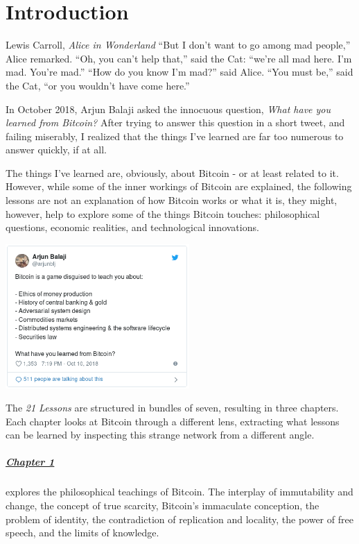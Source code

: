 \chapter*{Introduction}
\label{ch:introduction}

\begin{chapquote}{Lewis Carroll, \textit{Alice in Wonderland}}
\enquote{But I don’t want to go among mad people,} Alice remarked. \enquote{Oh, you can’t
help that,} said the Cat: \enquote{we’re all mad here. I’m mad. You’re mad.} \enquote{How do
you know I’m mad?} said Alice. \enquote{You must be,} said the Cat, \enquote{or you wouldn’t
have come here.}
\end{chapquote}

In October 2018, Arjun Balaji asked the innocuous question,
\textit{What have you learned from Bitcoin?} After trying to answer this
question in a short tweet, and failing miserably, I realized that the things
I've learned are far too numerous to answer quickly, if at all.

The things I've learned are, obviously, about Bitcoin - or at least related to
it. However, while some of the inner workings of Bitcoin are explained, the
following lessons are not an explanation of how Bitcoin works or what it is,
they might, however, help to explore some of the things Bitcoin touches:
philosophical questions, economic realities, and technological innovations.

\begin{center}
  \includegraphics[width=7cm]{assets/images/the-tweet.png}
\end{center}

The \textit{21 Lessons} are structured in bundles of seven, resulting in three
chapters. Each chapter looks at Bitcoin through a different lens, extracting
what lessons can be learned by inspecting this strange network from a different
angle.

\paragraph{\hyperref[ch:philosophy]{Chapter 1}}{explores the philosophical
teachings of Bitcoin. The interplay of immutability and change, the concept of
true scarcity, Bitcoin's immaculate conception, the problem of identity, the
contradiction of replication and locality, the power of free speech, and the
limits of knowledge.
}

